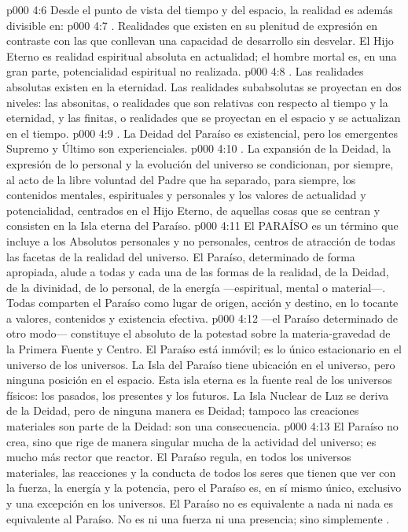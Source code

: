 \vs p000 4:6 \pc Desde el punto de vista del tiempo y del espacio, la realidad es además divisible en:
\vs p000 4:7 . Realidades que existen en su plenitud de expresión en contraste con las que conllevan una capacidad de desarrollo sin desvelar. El Hijo Eterno es realidad espiritual absoluta en actualidad; el hombre mortal es, en una gran parte, potencialidad espiritual no realizada.
\vs p000 4:8 . Las realidades absolutas existen en la eternidad. Las realidades subabsolutas se proyectan en dos niveles: las absonitas, o realidades que son relativas con respecto al tiempo y la eternidad, y las finitas, o realidades que se proyectan en el espacio y se actualizan en el tiempo.
\vs p000 4:9 . La Deidad del Paraíso es existencial, pero los emergentes Supremo y Último son experienciales.
\vs p000 4:10 . La expansión de la Deidad, la expresión de lo personal y la evolución del universo se condicionan, por siempre, al acto de la libre voluntad del Padre que ha separado, para siempre, los contenidos mentales, espirituales y personales y los valores de actualidad y potencialidad, centrados en el Hijo Eterno, de aquellas cosas que se centran y consisten en la Isla eterna del Paraíso.
\vs p000 4:11 \pc El PARAÍSO es un término que incluye a los Absolutos personales y no personales, centros de atracción de todas las facetas de la realidad del universo. El Paraíso, determinado de forma apropiada, alude a todas y cada una de las formas de la realidad, de la Deidad, de la divinidad, de lo personal, de la energía ---espiritual, mental o material---. Todas comparten el Paraíso como lugar de origen, acción y destino, en lo tocante a valores, contenidos y existencia efectiva.
\vs p000 4:12 \pc {} ---el Paraíso determinado de otro modo--- constituye el absoluto de la potestad sobre la materia\hyp{}gravedad de la Primera Fuente y Centro. El Paraíso está inmóvil; es lo único estacionario en el universo de los universos. La Isla del Paraíso tiene ubicación en el universo, pero ninguna posición en el espacio. Esta isla eterna es la fuente real de los universos físicos: los pasados, los presentes y los futuros. La Isla Nuclear de Luz se deriva de la Deidad, pero de ninguna manera es Deidad; tampoco las creaciones materiales son parte de la Deidad: son una consecuencia.
\vs p000 4:13 El Paraíso no crea, sino que rige de manera singular mucha de la actividad del universo; es mucho más rector que reactor. El Paraíso regula, en todos los universos materiales, las reacciones y la conducta de todos los seres que tienen que ver con la fuerza, la energía y la potencia, pero el Paraíso es, en sí mismo único, exclusivo y una excepción en los universos. El Paraíso no es equivalente a nada ni nada es equivalente al Paraíso. No es ni una fuerza ni una presencia; sino simplemente .
